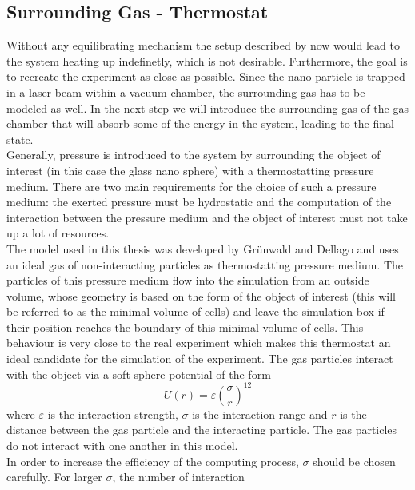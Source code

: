 \documentclass[12pt]{article}
\begin{document}
\subsection{Surrounding Gas - Thermostat}
Without any equilibrating mechanism the setup described by now would lead to the system heating up indefinetly, which is not desirable. Furthermore,
the goal is to recreate the experiment as close as possible. Since the nano particle is trapped in a laser beam within a vacuum chamber, the
surrounding gas has to be modeled as well. In the next step we will introduce the surrounding gas of the gas chamber that will absorb some of the 
energy in the system, leading to the final state.\\
Generally, pressure is introduced to the system by surrounding the object of interest (in this case the glass nano sphere) with a thermostatting
pressure medium.
There are two main requirements for the choice of such a pressure medium: the exerted pressure must be hydrostatic and the computation of the
interaction between the pressure medium and the object of interest must not take up a lot of resources.\\
The model used in this thesis was developed by Gr\"unwald and Dellago \cite{Gruenwald2006} and uses an ideal gas of non-interacting particles as
thermostatting pressure medium. The particles of this pressure medium flow into the simulation from an outside volume, whose geometry is based on the form of the
object of interest (this will be referred to as the minimal volume of cells) and leave the simulation box if their position reaches the boundary of
this minimal volume of cells. This behaviour is very close to the real experiment which makes this thermostat an ideal candidate for the simulation of
the experiment. 
The gas particles interact with the object via a soft-sphere potential of the form
\begin{equation}
    \label{eq:softsphere}
    U(r) = \varepsilon \left(\frac{\sigma}{r}\right)^{12}
\end{equation}
where $\varepsilon$ is the interaction strength, $\sigma$ is the interaction range and $r$ is the distance between the gas particle and the
interacting particle. The gas particles do not interact with one another in this model.\\
In order to increase the efficiency of the computing process, $\sigma$ should be chosen carefully. For larger $\sigma$, the number of interaction
\end{document}
